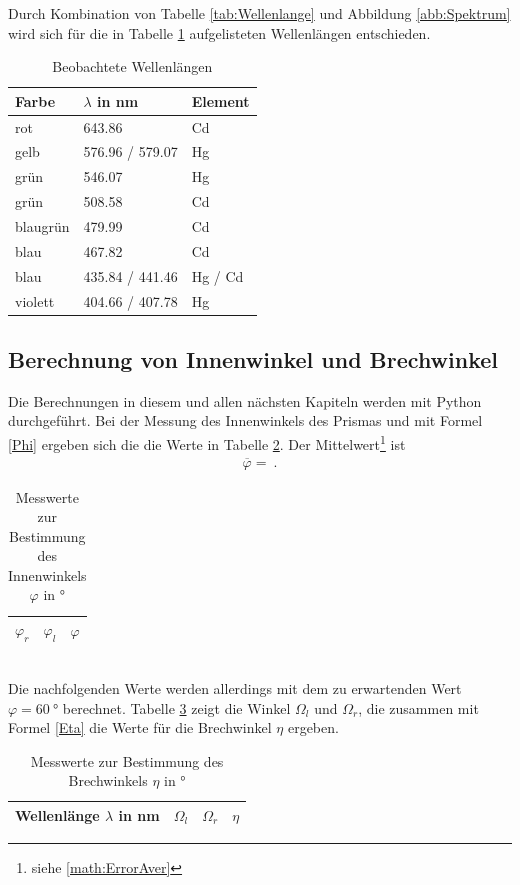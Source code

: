 Durch Kombination von Tabelle \ref{tab:Wellenlange} und Abbildung \ref{abb:Spektrum} wird sich für die in Tabelle \ref{tab:Wellen} aufgelisteten Wellenlängen entschieden.
\begin{table}[h!]
\centering
\begin{tabular}{lll}
	Farbe & $\lambda$ in \si{\nano\meter} & Element \\
	\hline
	rot & 643.86 & Cd \\
	gelb & 576.96 / 579.07 & Hg \\
	grün & 546.07 & Hg \\
	grün & 508.58 & Cd \\
	blaugrün & 479.99 & Cd \\
	blau & 467.82 & Cd \\
	blau & 435.84 / 441.46 & Hg / Cd \\
	violett & 404.66 / 407.78 & Hg
\end{tabular}
\caption{Beobachtete Wellenlängen}
\label{tab:Wellen}
\end{table}
\clearpage


\subsection{Berechnung von Innenwinkel und Brechwinkel}
Die Berechnungen in diesem und allen nächsten Kapiteln werden mit Python durchgeführt.
Bei der Messung des Innenwinkels des Prismas und mit Formel \eqref{Phi} ergeben sich die die Werte in Tabelle \ref{tab:WinkelPhi}. Der Mittelwert\footnote{siehe \ref{math:ErrorAver}} ist
\begin{align}
	\overline{\varphi} =  \ .
\end{align}
\begin{table}[h!]
	\centering	
	\begin{tabular}{c|c|c}
		$\varphi_r$ & $\varphi_l$ & $\varphi$ \\
		\hline
		
	\end{tabular}
	\caption{Messwerte zur Bestimmung des Innenwinkels $\varphi$ in \si{\degree}}
	\label{tab:WinkelPhi}
\end{table} \\
Die nachfolgenden Werte werden allerdings mit dem zu erwartenden Wert $\varphi= \SI{60}{\degree}$ berechnet.
Tabelle \ref{tab:WinkelFarben} zeigt die Winkel $\Omega_l$ und $\Omega_r$, die zusammen mit Formel \eqref{Eta} die Werte für die Brechwinkel $\eta$ ergeben.
\begin{table}[h!]
	\centering	
	\begin{tabular}{c|c|c|c}
		Wellenlänge $\lambda$ in \si{\nano\meter} & $\Omega_l$ & $\Omega_r$ & $\eta$ \\
		\hline
		
	\end{tabular}
	\caption{Messwerte zur Bestimmung des Brechwinkels $\eta$ in \si{\degree}}
	\label{tab:WinkelFarben}
\end{table}
\clearpage


